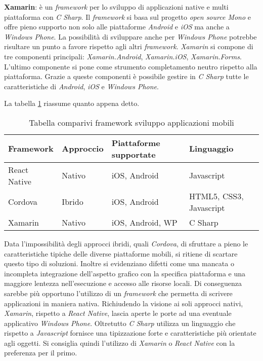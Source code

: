 \textbf{Xamarin}: è un \emph{framework} per lo sviluppo di applicazioni native e multi piattaforma con \emph{C Sharp}. Il \emph{framework} si basa sul progetto \emph{open source Mono} e offre pieno supporto non solo alle piattaforme \emph{Android} e \emph{iOS} ma anche a \emph{Windows Phone}. La possibilità di sviluppare anche per \emph{Windows Phone} potrebbe risultare un punto a favore rispetto agli altri \emph{framework}. \emph{Xamarin} si compone di tre componenti principali: \emph{Xamarin.Android}, \emph{Xamarin.iOS}, \emph{Xamarin.Forms}. L’ultimo componente si pone come strumento completamento neutro rispetto alla piattaforma. Grazie a queste componenti è possibile gestire in \emph{C Sharp} tutte le caratteristiche di \emph{Android}, \emph{iOS} e \emph{Windows Phone}.
\medskip

 La tabella \ref{tab:comp-framework} riassume quanto appena detto.
\begin{table}[!h] %
    \caption{Tabella comparivi framework sviluppo applicazioni mobili}
    \label{tab:comp-framework}
    \begin{tabularx}{\textwidth}{llll}
    \hline
    \textbf{Framework} & \textbf{Approccio} & \textbf{Piattaforme supportate} &\textbf{Linguaggio}\\
    \hline
    React Native   & Nativo & iOS, Android & Javascript\\
    \hline
    Cordova   & Ibrido & iOS, Android & HTML5, CSS3, Javascript\\
    \hline
    Xamarin   & Nativo & iOS, Android, WP & C Sharp\\
    \hline
    \end{tabularx}
    \end{table}%
Data l’impossibilità degli approcci ibridi, quali \emph{Cordova}, di sfruttare a pieno le caratteristiche tipiche delle diverse piattaforme mobili, si ritiene di scartare questo tipo di soluzioni.
Inoltre si evidenziano difetti come una mancata o incompleta integrazione dell’aspetto grafico con la specifica piattaforma e una maggiore lentezza nell’esecuzione e accesso alle risorse locali.
Di conseguenza sarebbe più opportuno l’utilizzo di un \emph{framework} che permetta di scrivere applicazioni in maniera nativa. 
Richiudendo la visione ai soli approcci nativi, \emph{Xamarin}, rispetto a \emph{React Native}, lascia aperte le porte ad una eventuale applicativo \emph{Windows Phone}. Oltretutto \emph{C Sharp} utilizza un linguaggio che rispetto a \emph{Javascript} fornisce una tipizzazione forte e caratteristiche più orientate agli oggetti. Si consiglia quindi l’utilizzo di \emph{Xamarin} o \emph{React Native} con la preferenza per il primo.
